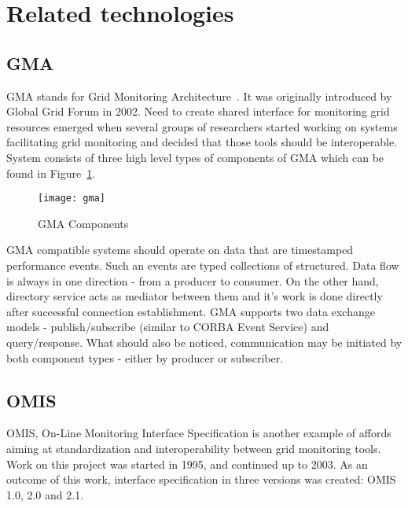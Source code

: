 %
 
 
\section{Related technologies}




\subsection{GMA}
\label{ssec:gma}
GMA stands for Grid Monitoring Architecture~\cite{GMA1,GMA2}. It was originally introduced by Global Grid Forum in 2002. Need to create shared interface for monitoring grid resources emerged when several groups of researchers started working on systems facilitating grid monitoring and decided that those tools should be interoperable. System consists of three high level types of components of GMA which can be found in Figure~\ref{fig:gma}.

\begin{figure}[ht]
  \centering
  \texttt{[image: gma]}
  \caption{GMA Components}
  \label{fig:gma}
\end{figure}

GMA compatible systems should operate on data that are timestamped performance events. Such an events are typed collections of structured. Data flow is always in one direction - from a producer to consumer. On the other hand, directory service acts as mediator between them and it\rq{}s work is done directly after successful connection establishment. GMA supports two data exchange models - publish/subscribe (similar to CORBA Event Service) and query/response. What should also be noticed, communication may be initiated by both component types - either by producer or subscriber.


\subsection{OMIS}
\label{ssec:omis}
OMIS, On-Line Monitoring Interface Specification is another example of affords aiming at standardization and interoperability between grid monitoring tools. Work on this project was started in 1995, and continued up to 2003. As an outcome of this work, interface specification in three versions was created: OMIS 1.0\cite{OMIS1}, 2.0\cite{OMIS2} and 2.1.

